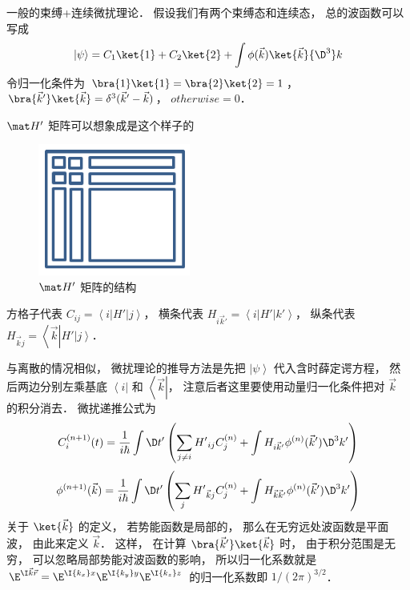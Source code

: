 

一般的束缚+连续微扰理论． 假设我们有两个束缚态和连续态， 总的波函数可以写成
 \begin{equation}
\left| \psi  \right\rangle  = {C_1}\ket{1}  + {C_2}\ket{2}  + \int {\phi (\vec k)\ket{\vec k}{\D ^3}k} 
\end{equation}
令归一化条件为 $\bra{1}\ket{1} = \bra{2}\ket{2} = 1$，  $\bra{\vec k'}\ket{\vec k}  = {\delta ^3}(\vec k' - \vec k)$，  $otherwise = 0$． 

 $\mat H'$  矩阵可以想象成是这个样子的
\begin{figure}[ht]
\centering
\includegraphics[width=5cm]{./figures/PTCont.pdf}
\caption{$\mat H'$ 矩阵的结构} 
\end{figure}

方格子代表 ${C_{ij}} = \left\langle i \right|H'\left| j \right\rangle $，  横条代表 ${H_{i\vec k'}} = \left\langle i \right|H'\left| {k'} \right\rangle $，  纵条代表 ${H_{\vec kj}} = \left\langle {\vec k} \right|H'\left| j \right\rangle $． 

与离散的情况相似， 微扰理论的推导方法是先把 $\left| \psi  \right\rangle $ 代入含时薛定谔方程， 然后两边分别左乘基底 $\left\langle i \right|$ 和 $\left\langle {\vec k} \right|$，  注意后者这里要使用动量归一化条件把对 $\vec k$ 的积分消去． 微扰递推公式为
 \begin{equation}
C_i^{(n + 1)}(t) = \frac{1}{{i\hbar }}\int {\D t'\left( {\sum\limits_{j \ne i} {{{H'}_{ij}}C_j^{(n)}}  + \int {{H_{i\vec k'}}{\phi ^{(n)}}(\vec k'){\D ^3}k'} } \right)} 
\end{equation}
 \begin{equation}
 {\phi ^{(n + 1)}}(\vec k) = \frac{1}{{i\hbar }}\int {\D t'\left( {\sum\limits_j {{{H'}_{\vec kj}}C_j^{(n)}}  + \int {{H_{\vec k\vec k'}}{\phi ^{(n)}}(\vec k'){\D ^3}k'} } \right)} 
\end{equation}
关于 $\ket{\vec k}$  的定义， 若势能函数是局部的， 那么在无穷远处波函数是平面波， 由此来定义 $\vec k$．  这样， 在计算 $\bra{\vec k'}\ket{\vec k}$ 时， 由于积分范围是无穷， 可以忽略局部势能对波函数的影响， 所以归一化系数就是 ${\E^{\I \vec k\vec r}} = {\E^{\I{k_x}x}}{\E^{\I{k_y}y}}{\E^{\I{k_z}z}}$ 的归一化系数即 $1/{(2\pi )^{3/2}}$． 
 
